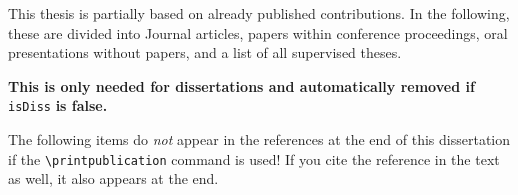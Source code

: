 This thesis is partially based on already published contributions. In the following, these are divided into Journal articles, papers within conference proceedings, oral presentations without papers, and a list of all supervised theses.

\textbf{This is only needed for dissertations and automatically removed if }\verb+isDiss+\textbf{ is false.}

The following items do \emph{not} appear in the references at the end of this dissertation if the \verb+\printpublication+ command is used! If you cite the reference in the text as well, it also appears at the end.

